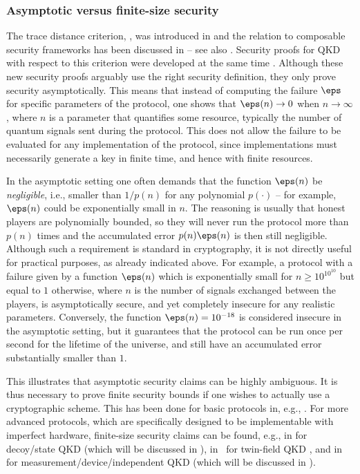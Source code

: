 \subsubsection{Asymptotic versus finite-size security}

The trace distance criterion, , was introduced in
\textcite{RK05,BHLMO05,Ren05} and the relation to composable security
frameworks has been discussed in \textcite{BHLMO05,MR09} \--- see also
. Security proofs for QKD with respect to this
criterion were developed at the same time
\cite{CRE04,RGK05,Ren05}. Although these new security proofs arguably
use the right security definition, they only prove security
asymptotically. This means that instead of computing the failure
$\eps$ for specific parameters of the protocol, one shows that
$\eps(n) \to 0$ when $n \to \infty$, where $n$ is a parameter that
quantifies some resource, typically the number of quantum signals sent
during the protocol. This does not allow the failure to be evaluated
for any implementation of the protocol, since implementations must
necessarily generate a key in finite time, and hence with finite
resources.

In the asymptotic setting one often demands that the function
$\eps(n)$ be \emph{negligible}, i.e., smaller than $1/p(n)$ for any
polynomial $p(\cdot)$ \--- for example, $\eps(n)$ could be
exponentially small in $n$. The reasoning is usually that honest
players are polynomially bounded, so they will never run the protocol
more than $p(n)$ times and the accumulated error $p(n)\eps(n)$ is then
still negligible. Although such a requirement is standard in
cryptography, it is not directly useful for practical purposes, as
already indicated above.  For example, a protocol with a failure given
by a function $\eps(n)$ which is exponentially small for $n \geq
10^{10^{10}}$ but equal to $1$ otherwise, where $n$ is the number of
signals exchanged between the players, is asymptotically secure, and
yet completely insecure for any realistic parameters. Conversely, the
function $\eps(n) = 10^{-18}$ is considered insecure in the asymptotic
setting, but it guarantees that the protocol can be run once per
second for the lifetime of the universe, and still have an accumulated
error substantially smaller than $1$.

This illustrates that asymptotic security claims can be highly
ambiguous. It is thus necessary to prove finite security bounds if one
wishes to actually use a cryptographic scheme. This has been done for
basic protocols in, e.g.,
\textcite{ILM07,SR08,STS10,TLGR12,HT12,TL17}. For more advanced
protocols, which are specifically designed to be implementable with
imperfect hardware, finite-size security claims can be found, e.g., in
\textcite{LCWXZ14} for decoy\-/state QKD (which will be discussed in
), in~\textcite{YinChen} for
twin-field QKD \cite{Lucamarinietal}, and in \textcite{CXCLTL14} for
measurement\-/device\-/independent QKD (which will be discussed in
).

